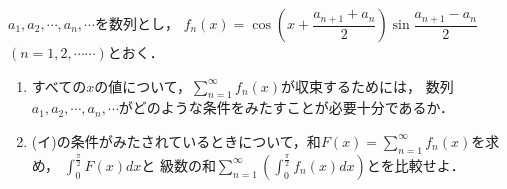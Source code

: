 \documentclass[../../main.tex]{subfiles}
\begin{document}
$a_1,a_2,\cdots,a_n,\cdots$を数列とし，
$\displaystyle f_n(x)=\cos \left( x+\dfrac{a_{n+1}+a_n}{2} \right) \sin\dfrac{a_{n+1}-a_n}{2}$ $(n=1,2,\cdots\cdots)$とおく．
\begin{enumerate}
  \item[(イ)] すべての$x$の値について，$\displaystyle\sum_{n=1}^\infty f_n(x)$が収束するためには，
    数列$a_1,a_2,\cdots,a_n,\cdots$がどのような条件をみたすことが必要十分であるか．
  \item[(ロ)] (イ)の条件がみたされているときについて，和$\displaystyle F(x)=\sum_{n=1}^\infty f_n(x)$を求め，
    $\displaystyle\int_0^{\frac{\pi}{2}}F(x)dx$と
    級数の和$\displaystyle\sum_{n=1}^\infty \left( \int_0^{\frac{\pi}{2}}f_n(x)dx \right)$とを比較せよ．
\end{enumerate}
\end{document}

